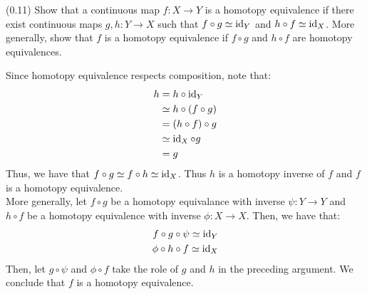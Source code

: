 \documentclass[12pt]{article}
\begin{document}
\begin{problab}{2}
    (0.11) Show that a continuous map $f: X \to Y$ is a homotopy equivalence if there exist continuous maps $g, h: Y \to X$ such that $f\circ g \simeq \operatorname{id}_Y$ and $h \circ f \simeq \operatorname{id}_X$. More generally, show that $f$ is a homotopy equivalence if $f \circ g$ and $h \circ f$ are homotopy equivalences.
\end{problab}
\begin{solu}
    Since homotopy equivalence respects composition, note that: 
    \begin{align*}
        h &= h \circ \operatorname{id}_Y \\
        &\simeq h \circ (f \circ g) \\
        &= (h \circ f) \circ g \\
        &\simeq \operatorname{id}_X \circ g \\
        &= g
    \end{align*}
    Thus, we have that $f \circ g \simeq f \circ h \simeq \operatorname{id}_X$. Thus $h$ is a homotopy inverse of $f$ and $f$ is a homotopy equivalence.\\
    More generally, let $f \circ g$ be a homotopy equivalance with inverse $\psi: Y \to Y$ and $h \circ f$ be a homotopy equivalence with inverse $\phi : X \to X$. Then, we have that: 
    \begin{align*}
        f \circ g \circ \psi \simeq \operatorname{id}_Y \\
        \phi \circ h \circ f \simeq \operatorname{id}_X    
    \end{align*}
    Then, let $g \circ \psi$ and $\phi \circ f$ take the role of $g$ and $h$ in the preceding argument. We conclude that $f$ is a homotopy equivalence.   
\end{solu}
\newpage
\end{document}

